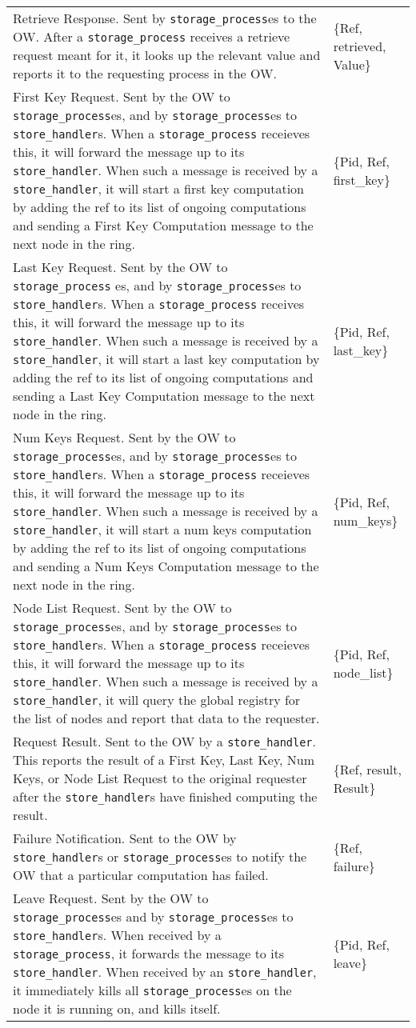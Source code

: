 \documentclass[12pt,letterpaper]{article}
\renewcommand{\tt}[1]{\texttt{#1}}
\newcommand{\sh}{\tt{store\_handler}}
\renewcommand{\sp}{\tt{storage\_process}}
\begin{document}
\begin{longtable}{p{4.5in}T}
Retrieve Response. Sent by \sp es to the OW. After a \sp{} receives a retrieve request meant for it, it looks up the relevant value and reports it to the requesting process in the OW. &
\{Ref, retrieved, Value\} \\

First Key Request. Sent by the OW to \sp es, and by \sp es to \sh s. When a \sp{} receieves this, it will forward the message up to its \sh. When such a message is received by a \sh, it will start a first key computation by adding the ref to its list of ongoing computations and sending a First Key Computation message to the next node in the ring. &
\{Pid, Ref, first\_key\} \\

Last Key Request. Sent by the OW to \sp{} es, and by \sp es to \sh s. When a \sp{} receives this, it will forward the message up to its \sh. When such a message is received by a \sh, it will start a last key computation by adding the ref to its list of ongoing computations and sending a Last Key Computation message to the next node in the ring. &
\{Pid, Ref, last\_key\} \\

Num Keys Request. Sent by the OW to \sp es, and by \sp es to \sh s. When a \sp{} receieves this, it will forward the message up to its \sh. When such a message is received by a \sh, it will start a num keys computation by adding the ref to its list of ongoing computations and sending a Num Keys Computation message to the next node in the ring. &
\{Pid, Ref, num\_keys\} \\

Node List Request. Sent by the OW to \sp es, and by \sp es to \sh s. When a \sp{} receieves this, it will forward the message up to its \sh.  When such a message is received by a \sh, it will query the global registry for the list of nodes and report that data to the requester. &
\{Pid, Ref, node\_list\} \\

Request Result. Sent to the OW by a \sh. This reports the result of a First Key, Last Key, Num Keys, or Node List Request to the original requester after the \sh s have finished computing the result. &
\{Ref, result, Result\} \\

Failure Notification. Sent to the OW by \sh s or \sp es to notify the OW that a particular computation has failed. &
\{Ref, failure\} \\

Leave Request. Sent by the OW to \sp es and by \sp es to \sh s. When received by a \sp, it forwards the message to its \sh. When received by an \sh, it immediately kills all \sp es on the node it is running on, and kills itself. &
\{Pid, Ref, leave\} \\


\end{longtable}
\end{document}
